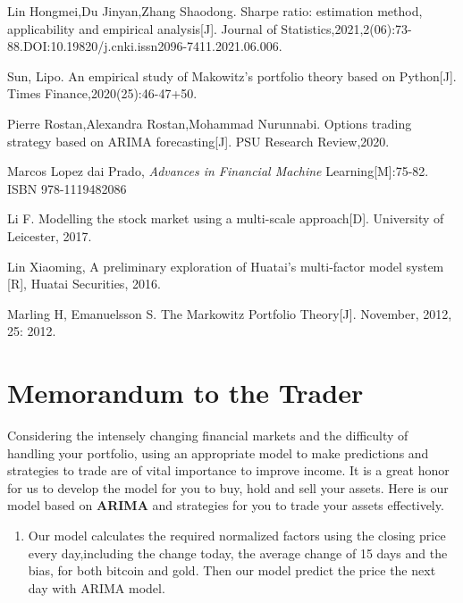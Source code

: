 \documentclass[12pt,a4paper]{article}
\newcommand{\Predictor}{ARIMA }
\begin{document}
\begin{spacing}{1.2}
\newpage
\begin{thebibliography}{00}


Lin Hongmei,Du Jinyan,Zhang Shaodong. Sharpe ratio: estimation method, applicability and empirical analysis[J]. Journal of Statistics,2021,2(06):73-88.DOI:10.19820/j.cnki.issn2096-7411.2021.06.006.

Sun, Lipo. An empirical study of Makowitz's portfolio theory based on Python[J]. Times Finance,2020(25):46-47+50.

Pierre Rostan,Alexandra Rostan,Mohammad Nurunnabi. Options trading strategy based on ARIMA forecasting[J]. PSU Research Review,2020.


Marcos Lopez dai Prado, \textit{Advances in Financial Machine} Learning[M]:75-82. ISBN 978-1119482086

Li F. Modelling the stock market using a multi-scale approach[D]. University of Leicester, 2017.

Lin Xiaoming, A preliminary exploration of Huatai's multi-factor model system [R], Huatai Securities, 2016.

Marling H, Emanuelsson S. The Markowitz Portfolio Theory[J]. November, 2012, 25: 2012.


\end{thebibliography}


\addtocounter{page}{-1}
\thispagestyle{empty}

\newpage
\addtocounter{page}{-1}
\thispagestyle{empty}

{\centering\section*{Memorandum to the Trader}}

Considering the intensely changing financial markets and the difficulty of handling your portfolio, using an appropriate model to make predictions and strategies to trade are of vital importance to improve income. It is a great honor for us to develop the model for you to buy, hold and sell your assets. Here is our model based on \textbf{\Predictor} and strategies for you to trade your assets effectively.  
	
\begin{enumerate}
	\item Our model calculates the required normalized factors using the closing price every day,including the change today, the average change of 15 days and the bias, for both bitcoin and gold. Then our model predict the price the next day with ARIMA model.
	 

\end{enumerate}
\end{spacing}
\end{document}
